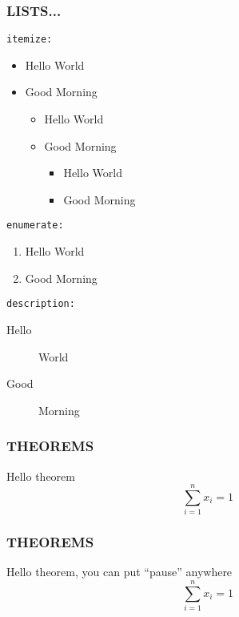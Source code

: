 \begin{frame}
\frametitle{LISTS...}
\texttt{itemize:}
\begin{itemize}
\item Hello \alert{World}
\item Good \alert{Morning}

  \begin{itemize}
  \item Hello \alert{World}
  \item Good \alert{Morning}
  
    \begin{itemize}
    \item Hello \alert{World}
    \item Good \alert{Morning}
    \end{itemize}
  
  \end{itemize}

\end{itemize}


\texttt{enumerate:}
\begin{enumerate}
\item Hello World
\item Good Morning
\end{enumerate}

\texttt{description:}
\begin{description}
\item [Hello] World
\item [Good] Morning
\end{description}

\end{frame}





\begin{frame}
\frametitle{THEOREMS}

\begin{theorem}
Hello theorem
\[
	\sum_{i=1}^n x_i = 1
\]
\end{theorem}
\end{frame}

\begin{frame}
\frametitle{THEOREMS}

\begin{theorem}
Hello theorem, you can put ``pause'' anywhere
\pause
\[
	\sum_{i=1}^n x_i = 1
\]
\end{theorem}
\end{frame}



